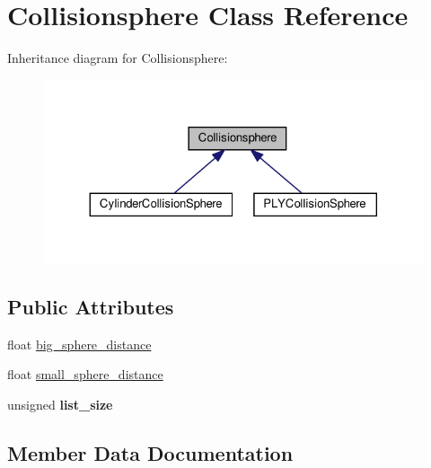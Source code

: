 \hypertarget{class_collisionsphere}{}\section{Collisionsphere Class Reference}
\label{class_collisionsphere}


Inheritance diagram for Collisionsphere\+:\nopagebreak
\begin{figure}[H]
\begin{center}
\leavevmode
\includegraphics[width=324pt]{class_collisionsphere__inherit__graph}
\end{center}
\end{figure}
\subsection*{Public Attributes}
\begin{DoxyCompactItemize}
\item 
float \hyperlink{class_collisionsphere_a4b791781efcb1af5198b22ea0b542cfb}{big\+\_\+sphere\+\_\+distance}
\item 
float \hyperlink{class_collisionsphere_ae5430c092ea0436edfe0adeb79402ff2}{small\+\_\+sphere\+\_\+distance}
\item 
\mbox{\label{class_collisionsphere_abf63a29c825cdd63ecb86d1dc430a0d4}} 
unsigned {\bfseries list\+\_\+size}
\end{DoxyCompactItemize}


\subsection{Member Data Documentation}
\mbox{\label{class_collisionsphere_a4b791781efcb1af5198b22ea0b542cfb}} 
